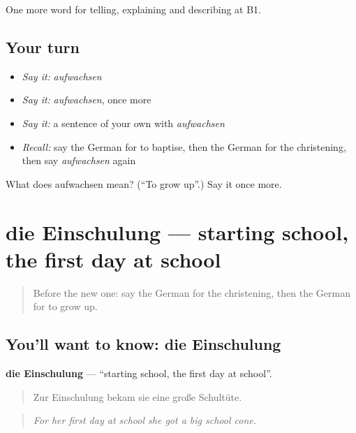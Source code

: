 \begin{grammarlens}[title={What you've built}]
One more word for telling, explaining and describing at B1.
\end{grammarlens}

\subsection*{Your turn}
\begin{itemize}
\raggedright
  \item \emph{Say it:} \emph{aufwachsen}
  \item \emph{Say it:} \emph{aufwachsen}, once more
  \item \emph{Say it:} a sentence of your own with \emph{aufwachsen}
  \item \emph{Recall:} say the German for to baptise, then the German for the christening, then say \emph{aufwachsen} again
\end{itemize}

\begin{tcolorbox}[breakable,colback=teal!4,colframe=teal!35!black,title={Before you move on}]
What does aufwachsen mean? (\textquotedblleft{}To grow up\textquotedblright{}.) Say it once more.
\end{tcolorbox}
\section[die Einschulung]{die Einschulung — starting school, the first day at school}

\label{lesson:GE-C297-einschulung}



\begin{quote}
Before the new one: say the German for the christening, then the German for to grow up.
\end{quote}

\subsection*{You'll want to know: die Einschulung}
\textbf{die Einschulung} — \textquotedblleft{}starting school, the first day at school\textquotedblright{}.

\begin{quote}
Zur Einschulung bekam sie eine große Schultüte.
\end{quote}

\begin{quote}
\emph{For her first day at school she got a big school cone.}
\end{quote}

